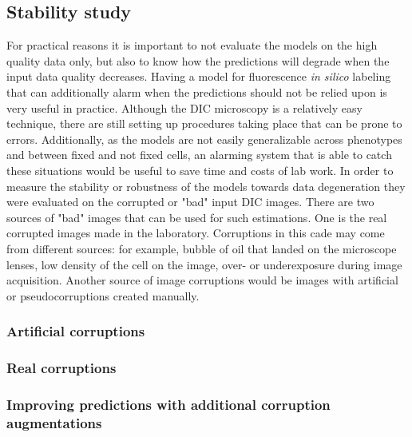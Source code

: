 \subsection{Stability study}
    For practical reasons it is important to not evaluate the models on the high quality data only, but also to know how the predictions will degrade when the input data quality decreases. Having a model for fluorescence \textit{in silico} labeling that can additionally alarm when the predictions should not be relied upon is very useful in practice. Although the DIC microscopy is a relatively easy technique, there are still setting up procedures taking place that can be prone to errors. Additionally, as the models are not easily generalizable across phenotypes and between fixed and not fixed cells, an alarming system that is able to catch these situations would be useful to save time and costs of lab work. In order to measure the stability or robustness of the models towards data degeneration they were evaluated on the corrupted or "bad" input DIC images. There are two sources of "bad" images that can be used for such estimations. One is the real corrupted images made in the laboratory. Corruptions in this cade may come from different sources: for example, bubble of oil that landed on the microscope lenses, low density of the cell on the image, over- or underexposure during image acquisition. Another source of image corruptions would be images with artificial or pseudocorruptions created manually. 
    
    \subsubsection{Artificial corruptions}
        
    \subsubsection{Real corruptions}
        
    \subsubsection{Improving predictions with additional corruption augmentations}
        \label{section:augments-againts-corruptions}
        